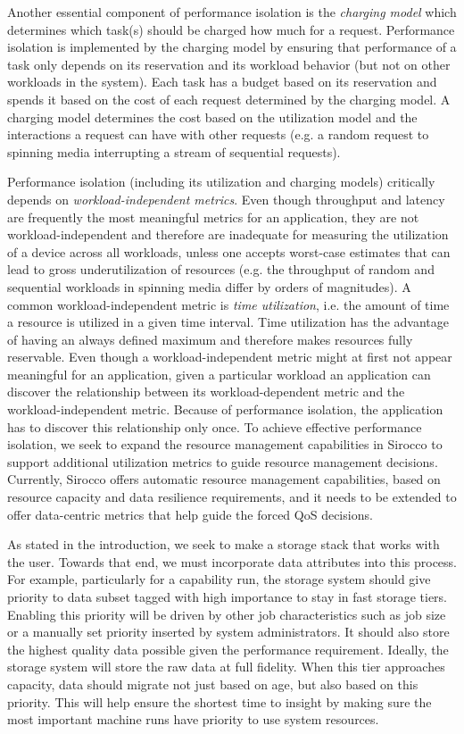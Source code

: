 Another essential component of performance isolation is the
\emph{charging model} which determines which task(s) should be
charged how much for a request. Performance isolation is implemented
by the charging model by ensuring that performance of a task only
depends on its reservation and its workload behavior (but not on
other workloads in the system). Each task has a budget based on its
reservation and spends it based on the cost of each request determined
by the charging model. A charging model determines the cost based
on the utilization model and the interactions a request can have
with other requests (e.g. a random request to spinning media
interrupting a stream of sequential requests).

Performance isolation (including its utilization and charging models)
critically depends on \emph{workload-independent metrics}. Even
though throughput and latency are frequently the most meaningful
metrics for an application, they are not workload-independent and
therefore are inadequate for measuring the utilization of a device
across all workloads, unless one accepts worst-case estimates that
can lead to gross underutilization of resources (e.g. the throughput
of random and sequential workloads in spinning media differ by
orders of magnitudes). A common workload-independent metric is
\emph{time utilization}, i.e. the amount of time a resource is
utilized in a given time interval. Time utilization has the advantage
of having an always defined maximum and therefore makes resources
fully reservable. Even though a workload-independent metric might
at first not appear meaningful for an application, given a particular
workload an application can discover the relationship between its
workload-dependent metric and the workload-independent metric.
Because of performance isolation, the application has to discover
this relationship only once.
To achieve effective performance isolation, we seek to expand the resource management
capabilities in Sirocco to support additional utilization 
metrics to guide resource management
decisions. Currently, Sirocco offers automatic resource management capabilities,
based on resource capacity and data resilience requirements, and it needs to be extended
to offer data-centric metrics that help guide the forced QoS decisions.

As stated in the introduction, we seek to make a storage stack that works with
the user. Towards that end, we must incorporate data attributes into this
process. For example, particularly for a capability run, the storage system
should give priority to data subset tagged with high importance to stay in fast
storage tiers. Enabling this priority will be driven by other job
characteristics such as job size or a manually set priority inserted by system
administrators. It should also store the highest quality data possible given
the performance requirement. Ideally, the storage system will store the raw
data at full fidelity. When this tier approaches capacity, data should migrate
not just based on age, but also based on this priority. This will help ensure
the shortest time to insight by making sure the most important machine runs
have priority to use system resources.

